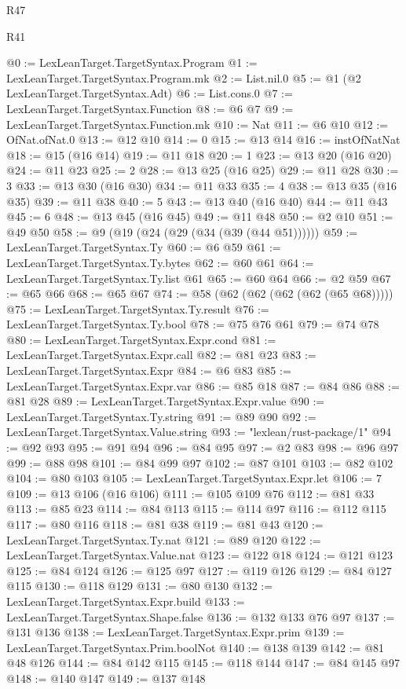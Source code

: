 \begin{lexlean}{R47}
\begin{lexlean}{R41}
\begin{coremodule}
{{{{{{{{{{{{{{{{{{{{{{{{{{{{{{{{{{{{{{{{{{{{{{{{{{{{{{{{{{{{{{{{{{{{{{{{{{{{{{{{{{{{{{{@0 := LexLeanTarget.TargetSyntax.Program
@1 := LexLeanTarget.TargetSyntax.Program.mk
@2 := List.nil.{0}
@5 := @1 (@2 LexLeanTarget.TargetSyntax.Adt)
@6 := List.cons.{0}
@7 := LexLeanTarget.TargetSyntax.Function
@8 := @6 @7
@9 := LexLeanTarget.TargetSyntax.Function.mk
@10 := Nat
@11 := @6 @10
@12 := OfNat.ofNat.{0}
@13 := @12 @10
@14 := 0
@15 := @13 @14
@16 := instOfNatNat
@18 := @15 (@16 @14)
@19 := @11 @18
@20 := 1
@23 := @13 @20 (@16 @20)
@24 := @11 @23
@25 := 2
@28 := @13 @25 (@16 @25)
@29 := @11 @28
@30 := 3
@33 := @13 @30 (@16 @30)
@34 := @11 @33
@35 := 4
@38 := @13 @35 (@16 @35)
@39 := @11 @38
@40 := 5
@43 := @13 @40 (@16 @40)
@44 := @11 @43
@45 := 6
@48 := @13 @45 (@16 @45)
@49 := @11 @48
@50 := @2 @10
@51 := @49 @50
@58 := @9 (@19 (@24 (@29 (@34 (@39 (@44 @51))))))
@59 := LexLeanTarget.TargetSyntax.Ty
@60 := @6 @59
@61 := LexLeanTarget.TargetSyntax.Ty.bytes
@62 := @60 @61
@64 := LexLeanTarget.TargetSyntax.Ty.list @61
@65 := @60 @64
@66 := @2 @59
@67 := @65 @66
@68 := @65 @67
@74 := @58 (@62 (@62 (@62 (@62 (@65 @68)))))
@75 := LexLeanTarget.TargetSyntax.Ty.result
@76 := LexLeanTarget.TargetSyntax.Ty.bool
@78 := @75 @76 @61
@79 := @74 @78
@80 := LexLeanTarget.TargetSyntax.Expr.cond
@81 := LexLeanTarget.TargetSyntax.Expr.call
@82 := @81 @23
@83 := LexLeanTarget.TargetSyntax.Expr
@84 := @6 @83
@85 := LexLeanTarget.TargetSyntax.Expr.var
@86 := @85 @18
@87 := @84 @86
@88 := @81 @28
@89 := LexLeanTarget.TargetSyntax.Expr.value
@90 := LexLeanTarget.TargetSyntax.Ty.string
@91 := @89 @90
@92 := LexLeanTarget.TargetSyntax.Value.string
@93 := "lexlean/rust-package/1"
@94 := @92 @93
@95 := @91 @94
@96 := @84 @95
@97 := @2 @83
@98 := @96 @97
@99 := @88 @98
@101 := @84 @99 @97
@102 := @87 @101
@103 := @82 @102
@104 := @80 @103
@105 := LexLeanTarget.TargetSyntax.Expr.let
@106 := 7
@109 := @13 @106 (@16 @106)
@111 := @105 @109 @76
@112 := @81 @33
@113 := @85 @23
@114 := @84 @113
@115 := @114 @97
@116 := @112 @115
@117 := @80 @116
@118 := @81 @38
@119 := @81 @43
@120 := LexLeanTarget.TargetSyntax.Ty.nat
@121 := @89 @120
@122 := LexLeanTarget.TargetSyntax.Value.nat
@123 := @122 @18
@124 := @121 @123
@125 := @84 @124
@126 := @125 @97
@127 := @119 @126
@129 := @84 @127 @115
@130 := @118 @129
@131 := @80 @130
@132 := LexLeanTarget.TargetSyntax.Expr.build
@133 := LexLeanTarget.TargetSyntax.Shape.false
@136 := @132 @133 @76 @97
@137 := @131 @136
@138 := LexLeanTarget.TargetSyntax.Expr.prim
@139 := LexLeanTarget.TargetSyntax.Prim.boolNot
@140 := @138 @139
@142 := @81 @48 @126
@144 := @84 @142 @115
@145 := @118 @144
@147 := @84 @145 @97
@148 := @140 @147
@149 := @137 @148
}}}}}}}}}}}}}}}}}}}}}}}}}}}}}}}}}}}}}}}}}}}}}}}}}}}}}}}}}}}}}}}}}}}}}}}}}}}}}}}}}}}}}}}
\end{coremodule}
\end{lexlean}
\end{lexlean}
